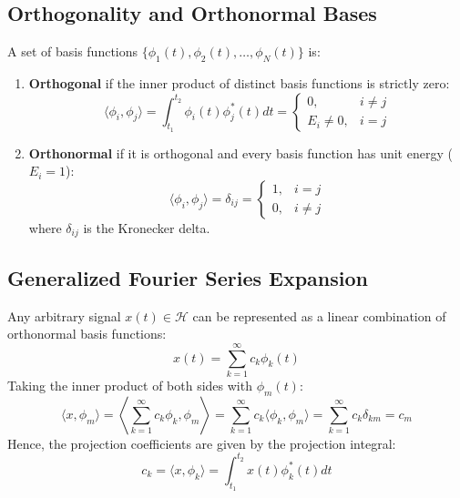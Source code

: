 \documentclass[12pt,a4paper]{article}
\begin{document}
\subsection{Orthogonality and Orthonormal Bases}

\begin{tcolorbox}[defbox, title={\textbf{Definition: Orthogonal and Orthonormal Signal Sets}}]
A set of basis functions $\{\phi_1(t), \phi_2(t), \dots, \phi_N(t)\}$ is:
\begin{enumerate}[topsep=2pt, itemsep=2pt]
  \item \textbf{Orthogonal} if the inner product of distinct basis functions is strictly zero:
  \begin{equation}
    \langle \phi_i, \phi_j \rangle = \int_{t_1}^{t_2} \phi_i(t) \phi_j^*(t) dt = \begin{cases} 0, & i \ne j \\ E_i \ne 0, & i = j \end{cases}
  \end{equation}
  \item \textbf{Orthonormal} if it is orthogonal and every basis function has unit energy ($E_i = 1$):
  \begin{equation}
    \langle \phi_i, \phi_j \rangle = \delta_{ij} = \begin{cases} 1, & i = j \\ 0, & i \ne j \end{cases}
  \end{equation}
  where $\delta_{ij}$ is the Kronecker delta.
\end{enumerate}
\end{tcolorbox}

\subsection{Generalized Fourier Series Expansion}
Any arbitrary signal $x(t) \in \mathcal{H}$ can be represented as a linear combination of orthonormal basis functions:
\begin{equation}
  x(t) = \sum_{k=1}^{\infty} c_k \phi_k(t)
\end{equation}
Taking the inner product of both sides with $\phi_m(t)$:
\begin{equation}
  \langle x, \phi_m \rangle = \left\langle \sum_{k=1}^{\infty} c_k \phi_k, \phi_m \right\rangle = \sum_{k=1}^{\infty} c_k \langle \phi_k, \phi_m \rangle = \sum_{k=1}^{\infty} c_k \delta_{km} = c_m
\end{equation}
Hence, the projection coefficients are given by the projection integral:
\begin{equation}
  c_k = \langle x, \phi_k \rangle = \int_{t_1}^{t_2} x(t) \phi_k^*(t) dt
\end{equation}
\end{document}
